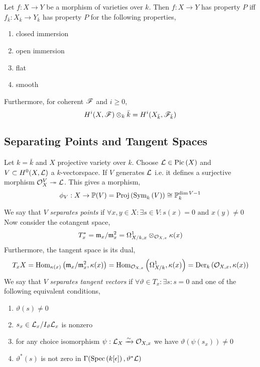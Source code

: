 \documentclass[12pt]{article}
\begin{document}
\begin{lemma}
Let $f : X \to Y$ be a morphism of varieties over $k$. Then $f : X \to Y$ has property $P$ iff $f_{\bar{k}} : X_{\bar{k}} \to Y_{\bar{k}}$ has property $P$ for the following properties,
\begin{enumerate}
\item closed immersion
\item open immersion
\item flat
\item smooth
\end{enumerate}
Furthermore, for coherent $\mathscr{F}$ and $i \ge 0$,
\[ H^i(X, \mathscr{F}) \otimes_k \bar{k} = H^i(X_{\bar{k}}, \mathscr{F}_{\bar{k}}) \]
\end{lemma}

\subsection{Separating Points and Tangent Spaces}

Let $k = \bar{k}$ and $X$ projective variety over $k$. Choose $\mathcal{L} \in \mathrm{Pic} \left( X \right)$ and $V \subset H^0(X, \mathcal{L})$ a $k$-vectorspace. If $V$ generates $\mathcal{L}$ i.e. it defines a surjective morphism $\mathcal{O}_{X}^V \twoheadrightarrow \mathcal{L}$. This gives a morphism,
\[ \phi_V : X \to \mathbb{P}(V) = \mathrm{Proj}\left( \mathrm{Sym}_{k}\left( V \right) \right) \cong \mathbb{P}^{\dim{V} - 1}_k \]

\begin{defn}
We say that $V$ \textit{separates points} if $\forall x, y \in X : \exists s \in V : s(x) = 0 \text{ and } x(y) \neq 0$
\bigskip\\
Now consider the cotangent space,
\[ T_x^* = \mathfrak{m}_x / \mathfrak{m}_x^2 = \Omega^1_{X/k, x} \otimes_{\mathcal{O}_{X, x}} \kappa(x) \]
Furthermore, the tangent space is its dual,
\[ T_x X = \mathrm{Hom}_{\kappa(x)} \left( \mathfrak{m}_x / \mathfrak{m}_x^2, \kappa(x) \right) = \mathrm{Hom}_{\mathcal{O}_{X, x}} \left( \Omega^1_{X/k}, \kappa(x) \right) = \mathrm{Der}_{k} \left( \mathcal{O}_{X, x}, \kappa(x) \right) \]
We say that $V$ \textit{separates tangent vectors} if $\forall \vartheta \in T_x : \exists s : s = 0$ and one of the following equivalent conditions,
\begin{enumerate}
\item $\vartheta(s) \neq 0$
\item $s_x \in \mathcal{L}_x / I_\vartheta \mathcal{L}_x$ is nonzero
\item for any choice isomorphism $\psi : \mathcal{L}_X \xrightarrow{\sim} \mathcal{O}_{X, x}$ we have $\vartheta(\psi(s_x)) \neq 0$
\item $\vartheta^*(s)$ is not zero in $\Gamma(\mathrm{Spec}\left( k[\epsilon] \right), \vartheta^* \mathcal{L})$
\end{enumerate}
\end{defn}
\end{document}
